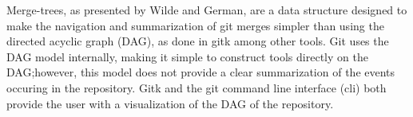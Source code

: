 Merge-trees, as presented by Wilde and German\cite{Wilde2016}, are a data structure
designed to make the navigation and summarization of git merges simpler than using
the directed acyclic graph (DAG), as done in gitk among other tools. Git uses the DAG model internally, making it simple to
construct tools directly on the DAG;\@ however, this model does not provide a clear
summarization of the events occuring in the repository. Gitk and the git command
line interface (cli) both provide the user with a visualization of the DAG of the
repository.
